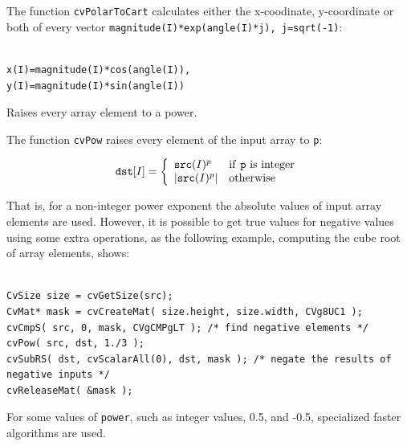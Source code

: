 The function \texttt{cvPolarToCart} calculates either the x-coodinate, y-coordinate or both of every vector \texttt{magnitude(I)*exp(angle(I)*j), j=sqrt(-1)}:

\begin{lstlisting}

x(I)=magnitude(I)*cos(angle(I)),
y(I)=magnitude(I)*sin(angle(I))

\end{lstlisting}


\label{Pow}

Raises every array element to a power.


\begin{description}
\end{description}


The function \texttt{cvPow} raises every element of the input array to \texttt{p}:

\[
\texttt{dst} [I] = \left\{ \begin{array}{l l} \texttt{src}(I)^p & \mbox{if \texttt{p} is integer}\\ |\texttt{src}(I)^p| & \mbox{otherwise}\\ \end{array} \right.
\]

That is, for a non-integer power exponent the absolute values of input array elements are used. However, it is possible to get true values for negative values using some extra operations, as the following example, computing the cube root of array elements, shows:

\begin{lstlisting}

CvSize size = cvGetSize(src);
CvMat* mask = cvCreateMat( size.height, size.width, CVg8UC1 );
cvCmpS( src, 0, mask, CVgCMPgLT ); /* find negative elements */
cvPow( src, dst, 1./3 );
cvSubRS( dst, cvScalarAll(0), dst, mask ); /* negate the results of negative inputs */
cvReleaseMat( &mask );

\end{lstlisting}

For some values of \texttt{power}, such as integer values, 0.5, and -0.5, specialized faster algorithms are used.

\label{Exp}

